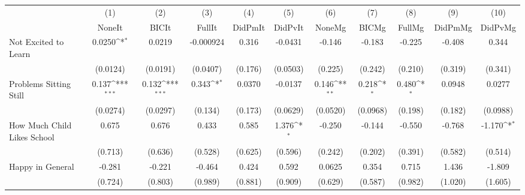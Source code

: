 {
\def\sym#1{\ifmmode^{#1}\else\(^{#1}\)\fi}
\begin{tabular}{l*{10}{c}}
\toprule
            &\multicolumn{1}{c}{(1)}&\multicolumn{1}{c}{(2)}&\multicolumn{1}{c}{(3)}&\multicolumn{1}{c}{(4)}&\multicolumn{1}{c}{(5)}&\multicolumn{1}{c}{(6)}&\multicolumn{1}{c}{(7)}&\multicolumn{1}{c}{(8)}&\multicolumn{1}{c}{(9)}&\multicolumn{1}{c}{(10)}\\
            &\multicolumn{1}{c}{NoneIt}&\multicolumn{1}{c}{BICIt}&\multicolumn{1}{c}{FullIt}&\multicolumn{1}{c}{DidPmIt}&\multicolumn{1}{c}{DidPvIt}&\multicolumn{1}{c}{NoneMg}&\multicolumn{1}{c}{BICMg}&\multicolumn{1}{c}{FullMg}&\multicolumn{1}{c}{DidPmMg}&\multicolumn{1}{c}{DidPvMg}\\
\midrule
Not Excited to Learn&      0.0250\sym{*}  &      0.0219         &   -0.000924         &       0.316         &     -0.0431         &      -0.146         &      -0.183         &      -0.225         &      -0.408         &       0.344         \\
            &    (0.0124)         &    (0.0191)         &    (0.0407)         &     (0.176)         &    (0.0503)         &     (0.225)         &     (0.242)         &     (0.210)         &     (0.319)         &     (0.341)         \\
\addlinespace
Problems Sitting Still&       0.137\sym{***}&       0.132\sym{***}&       0.343\sym{*}  &      0.0370         &     -0.0137         &       0.146\sym{**} &       0.218\sym{*}  &       0.480\sym{*}  &      0.0948         &      0.0277         \\
            &    (0.0274)         &    (0.0297)         &     (0.134)         &     (0.173)         &    (0.0629)         &    (0.0520)         &    (0.0968)         &     (0.198)         &     (0.182)         &    (0.0988)         \\
\addlinespace
How Much Child Likes School&       0.675         &       0.676         &       0.433         &       0.585         &       1.376\sym{*}  &      -0.250         &      -0.144         &      -0.550         &      -0.768         &      -1.170\sym{*}  \\
            &     (0.713)         &     (0.636)         &     (0.528)         &     (0.625)         &     (0.596)         &     (0.242)         &     (0.202)         &     (0.391)         &     (0.582)         &     (0.514)         \\
\addlinespace
Happy in General&      -0.281         &      -0.221         &      -0.464         &       0.424         &       0.592         &      0.0625         &       0.354         &       0.715         &       1.436         &      -1.809         \\
            &     (0.724)         &     (0.803)         &     (0.989)         &     (0.881)         &     (0.909)         &     (0.629)         &     (0.587)         &     (0.982)         &     (1.020)         &     (1.605)         \\
\bottomrule
\end{tabular}
}
